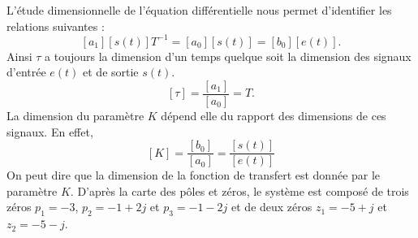 L'étude dimensionnelle de l'équation différentielle nous permet d'identifier
les relations suivantes :
\[
    [a_1][s(t)] T^{-1} = [a_0][s(t)] = [b_0][e(t)].
\]
Ainsi $\tau$ a toujours la dimension d'un temps quelque soit la dimension des 
signaux d'entrée  $e(t)$ et de sortie $s(t)$.
\[
    [\tau] = \dfrac{[a_1]}{[a_0]}= T.
\]
La dimension du paramètre $K$ dépend elle du rapport des dimensions de ces 
signaux. En effet,
\[
    [K]=\dfrac{[b_0]}{[a_0]}=\dfrac{[s(t)]}{[e(t)]}
\]
On peut dire que la dimension de la fonction de transfert est donnée par 
le paramètre $K$.
D'après la carte des pôles et zéros, le système est composé de trois zéros
$p_1=-3$, $p_2=-1+2j$ et $p_3=-1-2j$ et de deux zéros $z_1=-5+j$ et $z_2=-5-j$.

